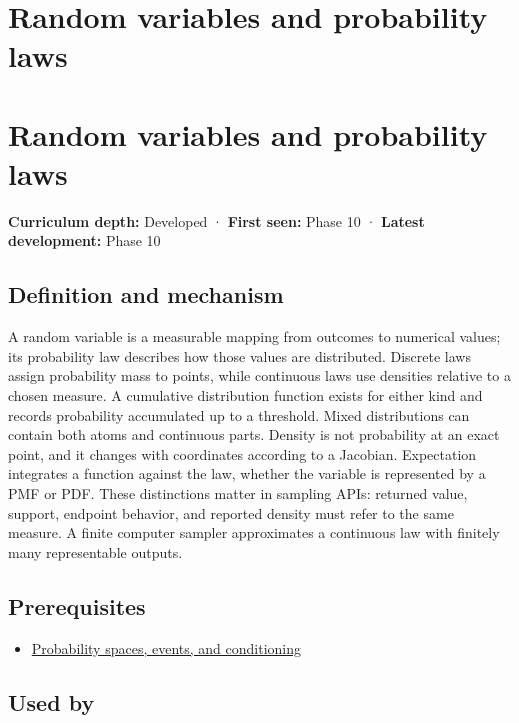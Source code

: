 \hypertarget{appendix-4d0203f7944f}{}
\section*{Random variables and probability laws}
\section{Random variables and probability laws}\label{appendix-4d0203f7944f-random-variables-and-probability-laws}

\textbf{Curriculum depth:} Developed · \textbf{First seen:} Phase 10 · \textbf{Latest development:} Phase 10

\subsection{Definition and mechanism}\label{appendix-4d0203f7944f-definition-and-mechanism}

A random variable is a measurable mapping from outcomes to numerical values; its probability law describes how those values are distributed. Discrete laws assign probability mass to points, while continuous laws use densities relative to a chosen measure. A cumulative distribution function exists for either kind and records probability accumulated up to a threshold. Mixed distributions can contain both atoms and continuous parts. Density is not probability at an exact point, and it changes with coordinates according to a Jacobian. Expectation integrates a function against the law, whether the variable is represented by a PMF or PDF. These distinctions matter in sampling APIs: returned value, support, endpoint behavior, and reported density must refer to the same measure. A finite computer sampler approximates a continuous law with finitely many representable outputs.

\subsection{Prerequisites}\label{appendix-4d0203f7944f-prerequisites}

\begin{itemize}
\tightlist
\item
  \hyperref[appendix-f1ef323f6ed7]{Probability spaces, events, and conditioning}
\end{itemize}

\subsection{Used by}\label{appendix-4d0203f7944f-used-by}

